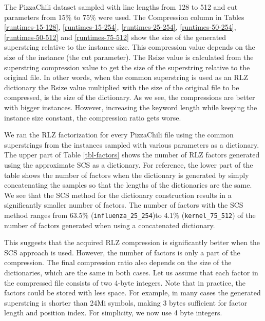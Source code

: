 \documentclass[english,twoside,censored,csm,algorithms-track-2020]{HYthesisML}
\theoremstyle{plain}
\theoremstyle{definition}
\begin{document}
The PizzaChili dataset sampled with line lengths from 128 to 512 and cut parameters from 15\% to
75\% were used. The Compression column in Tables \ref{runtimes-15-128}, \ref{runtimes-15-254},
\ref{runtimes-25-254}, \ref{runtimes-50-254}, \ref{runtimes-50-512} and \ref{runtimes-75-512} show the
size of the generated superstring relative to the instance size. This compression value depends
on the size of the instance (the cut parameter). The Rsize value is calculated from the superstring
compression value to get the size of the superstring relative to the original file. In other words,
when the common superstring is used as an RLZ dictionary the Rsize value
multiplied with the size of the original file to be compressed, is the size of the dictionary.
As we see, the compressions are better with bigger instances. However, increasing the keyword length
while keeping the instance size constant, the compression ratio gets worse. 

We ran the RLZ factorization for every PizzaChili file using the common superstrings from the instances
sampled with various parameters as a dictionary. The upper part of Table \ref{tbl-factors} shows the
number of RLZ factors generated using the approximate SCS as a dictionary.
For reference, the lower part of the table shows the number of factors when the dictionary
is generated by simply concatenating the samples so that the lengths of the dictionaries are the same. We see
that the SCS method for the dictionary construction results in a significantly smaller number of factors.
The number of factors with the SCS method ranges from 63.5\% (\texttt{influenza\_25\_254})to 4.1\%
(\texttt{kernel\_75\_512}) of the number of factors generated when using a concatenated dictionary.

This suggests that the acquired RLZ compression is significantly better when the SCS approach is
used. However, the number of factors is only a part of the compression. The final compression ratio
also depends on the size of the dictionaries, which are the same in both cases. Let us assume that each
factor in the compressed file consists of two 4-byte integers. Note that in practice, the factors
could be stored with less space. For example, in many cases the generated superstring is shorter than
24Mi symbols, making 3 bytes sufficient for factor length and position index.
For simplicity, we now use 4 byte integers.
\end{document}
